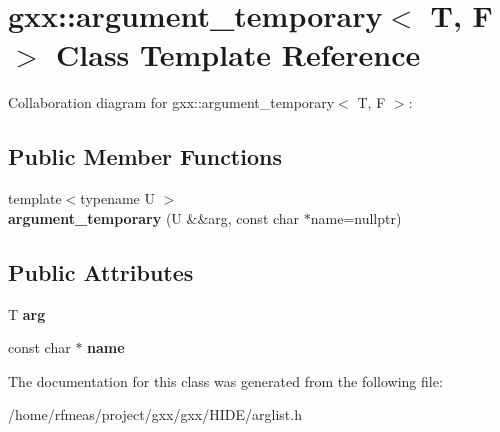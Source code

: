 \hypertarget{classgxx_1_1argument__temporary}{}\section{gxx\+:\+:argument\+\_\+temporary$<$ T, F $>$ Class Template Reference}
\label{classgxx_1_1argument__temporary}


Collaboration diagram for gxx\+:\+:argument\+\_\+temporary$<$ T, F $>$\+:
\subsection*{Public Member Functions}
\begin{DoxyCompactItemize}
\item 
{\footnotesize template$<$typename U $>$ }\\{\bfseries argument\+\_\+temporary} (U \&\&arg, const char $\ast$name=nullptr)\hypertarget{classgxx_1_1argument__temporary_aac80deb9dda0d1a0201ed763154a7c91}{}\label{classgxx_1_1argument__temporary_aac80deb9dda0d1a0201ed763154a7c91}

\end{DoxyCompactItemize}
\subsection*{Public Attributes}
\begin{DoxyCompactItemize}
\item 
T {\bfseries arg}\hypertarget{classgxx_1_1argument__temporary_a529739c9d72fe83137a89257e8259bed}{}\label{classgxx_1_1argument__temporary_a529739c9d72fe83137a89257e8259bed}

\item 
const char $\ast$ {\bfseries name}\hypertarget{classgxx_1_1argument__temporary_a4ec886fb49488055c1a4a6c8aaf6e982}{}\label{classgxx_1_1argument__temporary_a4ec886fb49488055c1a4a6c8aaf6e982}

\end{DoxyCompactItemize}


The documentation for this class was generated from the following file\+:\begin{DoxyCompactItemize}
\item 
/home/rfmeas/project/gxx/gxx/\+H\+I\+D\+E/arglist.\+h\end{DoxyCompactItemize}
